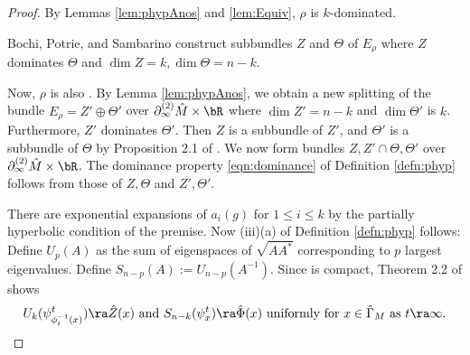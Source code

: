 \begin{proof} 
By Lemmas \ref{lem:phypAnos}  and \ref{lem:Equiv}, 
	$\rho$ is $k$-dominated.

	Bochi, Potrie, and Sambarino \cite{BPS} 
	construct subbundles $Z$ and $\Theta$ of $E_\rho$ 
	where $Z$ dominates $\Theta$
	and $\dim Z = k, \dim \Theta = n-k$. 

	Now, $\rho$ is also . 
	By Lemma \ref{lem:phypAnos}, 
	we obtain a new splitting of the bundle $E_\rho = Z'\oplus \Theta'$ 
	over $\partial_\infty^{(2)}\hat M \times \bR$
	where $\dim Z' = n-k$ and $\dim \Theta'$ is $k$. 
	Furthermore, $Z'$ dominates $\Theta'$. 
	Then $Z$ is a subbundle of $Z'$, and 
	 $\Theta'$ is a subbundle of $\Theta$ by 
	Proposition 2.1 of \cite{BPS}. 
	We now form bundles $Z, Z'\cap \Theta, \Theta'$ over $\partial_\infty^{(2)}\hat M \times \bR$. 
	The dominance property \eqref{eqn:dominance} of Definition \ref{defn:phyp}  follows from those of $Z, \Theta$ and $Z', \Theta'$. 
		
	There are exponential expansions 
	of $a_i(g)$ for $1\leq i \leq k$ by the partially 
	hyperbolic condition of the premise. 
	Now (iii)(a) of Definition \ref{defn:phyp} follows: 
	Define $U_p(A)$ as the sum of eigenspaces of $\sqrt{AA^*}$ corresponding to 
     $p$ largest eigenvalues. 
	Define $S_{n-p}(A):= U_{n-p}(A^{-1})$. 
	Since  is compact, Theorem 2.2 of \cite{BPS} shows 
	\[U_k(\psi^t_{\phi^{-1}_t(x)})\ra \hat Z(x) \hbox{ and } 
	S_{n-k}(\psi^t_x) \ra \hat \Phi(x) \hbox{ uniformly for $x \in \hat \Gamma_M$  as } t \ra \infty.\] 


\end{proof}

